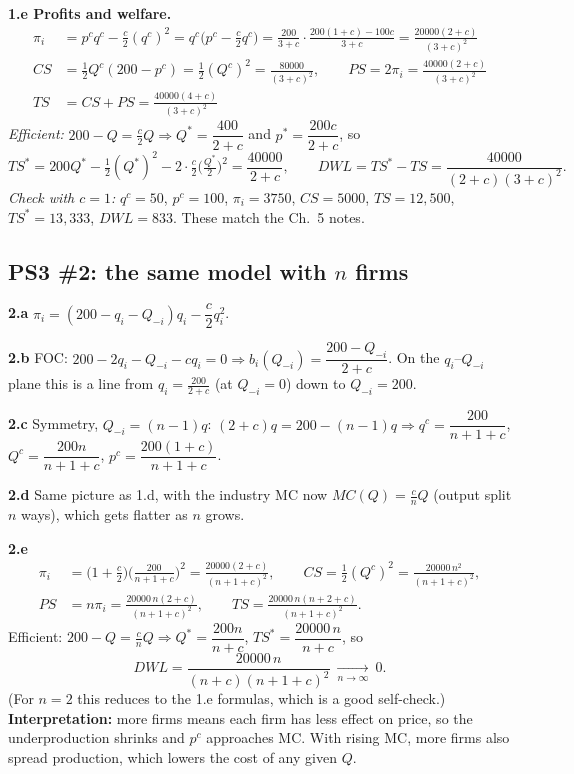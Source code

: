 \documentclass[11pt]{article}
\begin{document}
\textbf{1.e Profits and welfare.}
\begin{align*}
\pi_i&=p^cq^c-\tfrac c2(q^c)^2=q^c\Big(p^c-\tfrac c2q^c\Big)=\frac{200}{3+c}\cdot\frac{200(1+c)-100c}{3+c}=\boxed{\frac{20000(2+c)}{(3+c)^2}}\\
CS&=\tfrac12Q^c(200-p^c)=\tfrac12(Q^c)^2=\boxed{\frac{80000}{(3+c)^2}},\qquad PS=2\pi_i=\frac{40000(2+c)}{(3+c)^2}\\
TS&=CS+PS=\boxed{\frac{40000(4+c)}{(3+c)^2}}
\end{align*}
\emph{Efficient:} $200-Q=\tfrac c2Q\Rightarrow Q^*=\dfrac{400}{2+c}$ and $p^*=\dfrac{200c}{2+c}$, so
\[TS^*=200Q^*-\tfrac12(Q^*)^2-2\cdot\tfrac c2\Big(\tfrac{Q^*}{2}\Big)^2=\frac{40000}{2+c},\qquad
\boxed{DWL=TS^*-TS=\frac{40000}{(2+c)(3+c)^2}}.\]
\emph{Check with $c=1$:} $q^c=50$, $p^c=100$, $\pi_i=3750$, $CS=5000$, $TS=12{,}500$, $TS^*=13{,}333$, $DWL=833$. These match the Ch.~5 notes.

\subsection*{PS3 \#2: the same model with $n$ firms}
\textbf{2.a} $\pi_i=(200-q_i-Q_{-i})q_i-\dfrac c2q_i^2$.

\textbf{2.b} FOC: $200-2q_i-Q_{-i}-cq_i=0\Rightarrow\boxed{b_i(Q_{-i})=\dfrac{200-Q_{-i}}{2+c}}$. On the $q_i$--$Q_{-i}$ plane this is a line from $q_i=\frac{200}{2+c}$ (at $Q_{-i}=0$) down to $Q_{-i}=200$.

\textbf{2.c} Symmetry, $Q_{-i}=(n-1)q$: $(2+c)q=200-(n-1)q\Rightarrow\boxed{q^c=\dfrac{200}{n+1+c}}$, $Q^c=\dfrac{200n}{n+1+c}$, $\boxed{p^c=\dfrac{200(1+c)}{n+1+c}}$.

\textbf{2.d} Same picture as 1.d, with the industry MC now $MC(Q)=\frac cnQ$ (output split $n$ ways), which gets flatter as $n$ grows.

\textbf{2.e}
\begin{align*}
\pi_i&=\Big(1+\frac c2\Big)\Big(\frac{200}{n+1+c}\Big)^2=\frac{20000(2+c)}{(n+1+c)^2},\qquad
CS=\tfrac12(Q^c)^2=\frac{20000\,n^2}{(n+1+c)^2},\\
PS&=n\pi_i=\frac{20000\,n(2+c)}{(n+1+c)^2},\qquad
TS=\frac{20000\,n(n+2+c)}{(n+1+c)^2}.
\end{align*}
Efficient: $200-Q=\frac cnQ\Rightarrow Q^*=\dfrac{200n}{n+c}$, $TS^*=\dfrac{20000\,n}{n+c}$, so
\[\boxed{DWL=\frac{20000\,n}{(n+c)(n+1+c)^2}}\ \xrightarrow[n\to\infty]{}\ 0.\]
(For $n=2$ this reduces to the 1.e formulas, which is a good self-check.) \textbf{Interpretation:} more firms means each firm has less effect on price, so the underproduction shrinks and $p^c$ approaches MC. With rising MC, more firms also spread production, which lowers the cost of any given $Q$.
\end{document}
